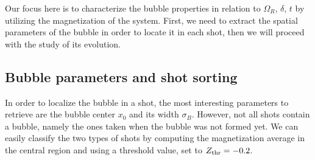 Our focus here is to characterize the bubble properties in relation to $\Omega_R$, $\delta$, $t$ by utilizing the magnetization of the system. First, we need to extract the spatial parameters of the bubble in order to locate it in each shot, then we will proceed with the study of its evolution.

\subsection{Bubble parameters and shot sorting}
In order to localize the bubble in a shot, the most interesting parameters to retrieve are the bubble center $x_0$ and its width $\sigma_B$.
However, not all shots contain a bubble, namely the ones taken when the bubble was not formed yet. We can easily classify the two types of shots by computing the magnetization average in the central region and using a threshold value, set to $Z_{\rm thr} = -0.2$. 

